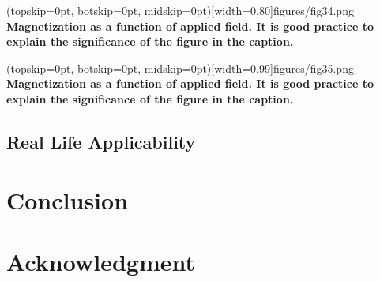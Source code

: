 \documentclass{ieeeaccess}
\begin{document}
\Figure[t!](topskip=0pt, botskip=0pt,
midskip=0pt)[width=0.80\columnwidth]{{figures/fig34.png}}
{ \textbf{Magnetization as a function of applied field.
        It is good practice to explain the significance of the figure in the
        caption.}\label{fig11}}

\Figure[t!](topskip=0pt, botskip=0pt,
midskip=0pt)[width=0.99\columnwidth]{{figures/fig35.png}}
{ \textbf{Magnetization as a function of applied field.
        It is good practice to explain the significance of the figure in the
        caption.}\label{fig12}}


\subsection{Real Life Applicability}

\section{Conclusion}


\section*{Acknowledgment}
\end{document}
